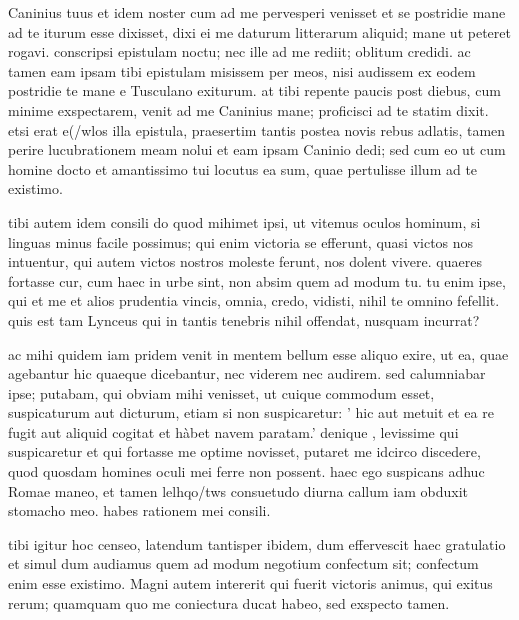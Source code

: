 


 Caninius tuus et idem noster cum ad me pervesperi venisset et se postridie mane ad te iturum esse dixisset, dixi ei me daturum litterarum aliquid; mane ut peteret rogavi. conscripsi epistulam noctu; nec ille ad me rediit; oblitum credidi. ac tamen eam ipsam tibi epistulam misissem per meos, nisi audissem ex eodem postridie te mane e Tusculano exiturum. at tibi repente paucis post diebus, cum minime exspectarem, venit ad me Caninius mane; proficisci ad te statim dixit. etsi erat e(/wlos illa epistula, praesertim tantis postea novis rebus adlatis, tamen perire lucubrationem meam nolui et eam ipsam Caninio dedi; sed cum eo ut cum homine docto et amantissimo tui locutus ea sum, quae pertulisse illum ad te existimo.

 tibi autem idem consili do quod mihimet ipsi, ut vitemus oculos hominum, si linguas minus facile possimus; qui enim victoria se efferunt, quasi victos nos intuentur, qui autem victos nostros moleste ferunt, nos dolent vivere. quaeres fortasse cur, cum haec in urbe sint, non absim quem ad modum tu. tu enim ipse, qui et me et alios prudentia vincis, omnia, credo, vidisti, nihil te omnino fefellit. quis est tam Lynceus qui in tantis tenebris nihil offendat, nusquam incurrat?

 ac mihi quidem iam pridem venit in mentem bellum esse aliquo exire, ut ea, quae agebantur hic quaeque dicebantur, nec viderem nec audirem. sed calumniabar ipse; putabam, qui obviam mihi venisset, ut cuique commodum esset, suspicaturum aut dicturum, etiam si non suspicaretur: ' hic aut metuit et ea re fugit aut aliquid cogitat et hàbet navem paratam.' denique , levissime qui suspicaretur et qui fortasse me optime novisset, putaret me idcirco discedere, quod quosdam homines oculi mei ferre non possent. haec ego suspicans adhuc Romae maneo, et tamen lelhqo/tws consuetudo diurna callum iam obduxit stomacho meo. habes rationem mei consili.

 tibi igitur hoc censeo, latendum tantisper ibidem, dum effervescit haec gratulatio et simul dum audiamus quem ad modum negotium confectum sit; confectum enim esse existimo. Magni autem intererit qui fuerit victoris animus, qui exitus rerum; quamquam quo me coniectura ducat habeo, sed exspecto tamen.

